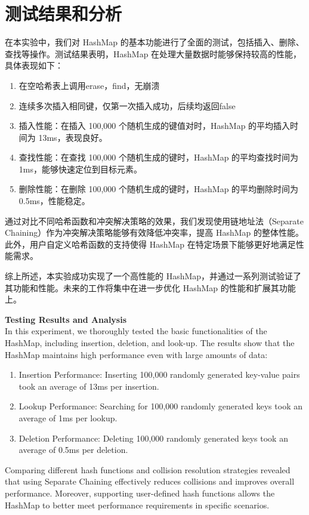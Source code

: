\documentclass{article}
\begin{document}
\section{测试结果和分析}
    在本实验中，我们对 HashMap 的基本功能进行了全面的测试，包括插入、删除、查找等操作。测试结果表明，HashMap 在处理大量数据时能够保持较高的性能，具体表现如下：
    \begin{enumerate}
        \item 在空哈希表上调用erase，find，无崩溃
        \item 连续多次插入相同键，仅第一次插入成功，后续均返回false
        \item 插入性能：在插入 100,000 个随机生成的键值对时，HashMap 的平均插入时间为 13ms，表现良好。
        \item 查找性能：在查找 100,000 个随机生成的键时，HashMap 的平均查找时间为 1ms，能够快速定位到目标元素。
        \item 删除性能：在删除 100,000 个随机生成的键时，HashMap 的平均删除时间为 0.5ms，性能稳定。
    \end{enumerate}

    通过对比不同哈希函数和冲突解决策略的效果，我们发现使用链地址法（Separate Chaining）作为冲突解决策略能够有效降低冲突率，提高 HashMap 的整体性能。此外，用户自定义哈希函数的支持使得 HashMap 在特定场景下能够更好地满足性能需求。

    综上所述，本实验成功实现了一个高性能的 HashMap，并通过一系列测试验证了其功能和性能。未来的工作将集中在进一步优化 HashMap 的性能和扩展其功能上。

    \bigskip
    \textbf{Testing Results and Analysis}\\
    In this experiment, we thoroughly tested the basic functionalities of the HashMap, including insertion, deletion, and look-up. The results show that the HashMap maintains high performance even with large amounts of data:
    \begin{enumerate}
        \item Insertion Performance: Inserting 100,000 randomly generated key-value pairs took an average of 13ms per insertion.
        \item Lookup Performance: Searching for 100,000 randomly generated keys took an average of 1ms per lookup.
        \item Deletion Performance: Deleting 100,000 randomly generated keys took an average of 0.5ms per deletion.
    \end{enumerate}

    Comparing different hash functions and collision resolution strategies revealed that using Separate Chaining effectively reduces collisions and improves overall performance. Moreover, supporting user-defined hash functions allows the HashMap to better meet performance requirements in specific scenarios.
\end{document}
